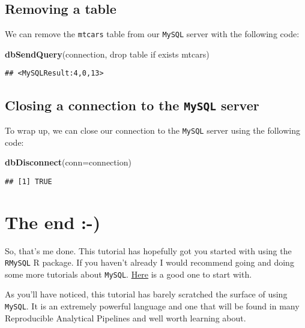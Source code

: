 \documentclass[
]{article}
\newenvironment{Shaded}{\begin{snugshade}}{\end{snugshade}}
\newcommand{\DataTypeTok}[1]{\textcolor[rgb]{0.13,0.29,0.53}{#1}}
\newcommand{\KeywordTok}[1]{\textcolor[rgb]{0.13,0.29,0.53}{\textbf{#1}}}
\newcommand{\NormalTok}[1]{#1}
\newcommand{\StringTok}[1]{\textcolor[rgb]{0.31,0.60,0.02}{#1}}
\begin{document}
\hypertarget{removing-a-table}{%
\subsection{Removing a table}\label{removing-a-table}}

We can remove the \texttt{mtcars} table from our \texttt{MySQL} server
with the following code:

\begin{Shaded}
\begin{Highlighting}[]
\KeywordTok{dbSendQuery}\NormalTok{(connection, }\StringTok{\textquotesingle{}drop table if exists mtcars\textquotesingle{}}\NormalTok{)}
\end{Highlighting}
\end{Shaded}

\begin{verbatim}
## <MySQLResult:4,0,13>
\end{verbatim}

\hypertarget{closing-a-connection-to-the-mysql-server}{%
\subsection{\texorpdfstring{Closing a connection to the \texttt{MySQL}
server}{Closing a connection to the MySQL server}}\label{closing-a-connection-to-the-mysql-server}}

To wrap up, we can close our connection to the \texttt{MySQL} server
using the following code:

\begin{Shaded}
\begin{Highlighting}[]
\KeywordTok{dbDisconnect}\NormalTok{(}\DataTypeTok{conn=}\NormalTok{connection)}
\end{Highlighting}
\end{Shaded}

\begin{verbatim}
## [1] TRUE
\end{verbatim}

\hypertarget{the-end--}{%
\section{The end :-)}\label{the-end--}}

So, that's me done. This tutorial has hopefully got you started with
using the \texttt{RMySQL} R package. If you haven't already I would
recommend going and doing some more tutorials about \texttt{MySQL}.
\href{https://www.tutorialspoint.com/mysql/index.htm}{Here} is a good
one to start with.

As you'll have noticed, this tutorial has barely scratched the surface
of using \texttt{MySQL}. It is an extremely powerful language and one
that will be found in many Reproducible Analytical Pipelines and well
worth learning about.
\end{document}
